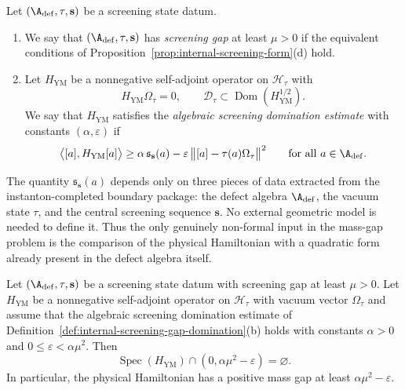 \begin{definition}
\label{def:internal-screening-gap-domination}
Let $(\A_{\mathrm{def}},\tau,\mathbf s)$ be a screening state datum.
\begin{enumerate}[label=(\alph*)]
\item We say that $(\A_{\mathrm{def}},\tau,\mathbf s)$ has \emph{screening gap} at least $\mu>0$
if the equivalent conditions of Proposition~\ref{prop:internal-screening-form}(d) hold.
\item Let $H_{\mathrm{YM}}$ be a nonnegative self-adjoint operator on $\mathcal H_\tau$ with
\[
H_{\mathrm{YM}}\Omega_\tau=0,
\qquad
\mathcal D_\tau\subset \operatorname{Dom}(H_{\mathrm{YM}}^{1/2}).
\]
We say that $H_{\mathrm{YM}}$ satisfies the \emph{algebraic screening domination estimate}
with constants $(\alpha,\varepsilon)$ if
\[
\bigl\langle [a],H_{\mathrm{YM}}[a]\bigr\rangle
\ge
\alpha\,\mathfrak s_{\mathbf s}(a)
-\varepsilon\,\bigl\|[a]-\tau(a)\Omega_\tau\bigr\|^2
\qquad\text{for all }a\in \A_{\mathrm{def}}.
\]
\end{enumerate}
\end{definition}

\begin{remark}
\label{rem:why-screening-estimate-is-internal}
The quantity $\mathfrak s_{\mathbf s}(a)$ depends only on three pieces of data extracted from the
instanton-completed boundary package: the defect algebra $\A_{\mathrm{def}}$, the vacuum state $\tau$,
and the central screening sequence $\mathbf s$.
No external geometric model is needed to define it.
Thus the only genuinely non-formal input in the mass-gap problem is the comparison of the physical
Hamiltonian with a quadratic form already present in the defect algebra itself.
\end{remark}

\begin{theorem}
\label{thm:mass-gap-reduction-internal-screening}
Let $(\A_{\mathrm{def}},\tau,\mathbf s)$ be a screening state datum with screening gap at least $\mu>0$.
Let $H_{\mathrm{YM}}$ be a nonnegative self-adjoint operator on $\mathcal H_\tau$ with vacuum vector
$\Omega_\tau$ and assume that the algebraic screening domination estimate of
Definition~\ref{def:internal-screening-gap-domination}(b) holds with constants $\alpha>0$ and
$0\le \varepsilon<\alpha\mu^2$.
Then
\[
\operatorname{Spec}(H_{\mathrm{YM}})\cap (0,\alpha\mu^2-\varepsilon)=\varnothing.
\]
In particular, the physical Hamiltonian has a positive mass gap at least $\alpha\mu^2-\varepsilon$.
\end{theorem}


